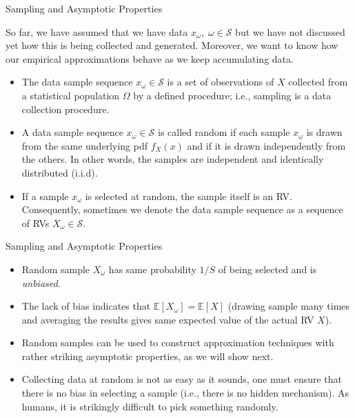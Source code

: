 \documentclass[9pt]{beamer}
\begin{document}
%
\begin{frame}{Sampling and Asymptotic Properties}

So far, we have assumed that we have data $x_\omega,\; \omega \in \mathcal{S}$ but we have not discussed yet how this is being collected and generated.  Moreover, we want to know how our empirical approximations behave as we keep accumulating data.  

\begin{itemize}
\item The data sample sequence $x_\omega \in \mathcal{S}$ is a set of observations of $X$ collected from a statistical population $\Omega$ by a defined procedure; i.e., sampling is a data collection procedure. 

\item A data sample sequence $x_\omega \in \mathcal{S}$ is called random if each sample $x_\omega$ is drawn from the same underlying pdf $f_X(x)$ and if it is drawn independently from the others. In other words, the samples are independent and identically distributed (i.i.d).

\item If a sample $x_\omega$ is selected at random, the sample itself is an RV. Consequently, sometimes we denote the data sample sequence as a sequence of RVs $X_\omega \in \mathcal{S}$.  

\end{itemize}

\end{frame}

%
\begin{frame}{Sampling and Asymptotic Properties}

\begin{itemize}

\item Random sample $X_\omega$ has same probability $1/S$ of being selected and is {\em unbiased}. 

\item The lack of bias indicates that $\mathbb{E}[X_\omega]=\mathbb{E}[X]$ (drawing sample many times and averaging the results gives same expected value of the actual RV $X$). 

\item Random samples can be used to construct approximation techniques with rather striking asymptotic properties, as we will show next.  

\item Collecting data at random is not as easy as it sounds, one must ensure that there is no bias in selecting a sample (i.e., there is no hidden mechanism).  As humans, it is strikingly difficult to pick something randomly. 

\end{itemize}

\end{frame}
\end{document}
